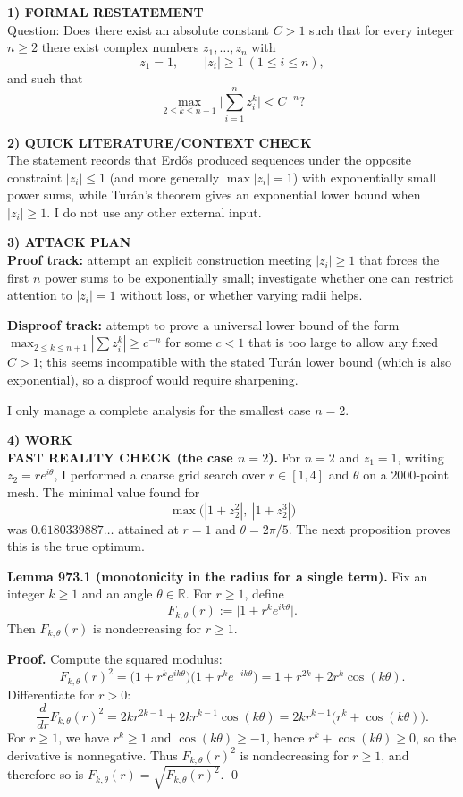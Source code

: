 \medskip
\noindent\textbf{1) FORMAL RESTATEMENT}\\
Question: Does there exist an absolute constant $C>1$ such that for every integer $n\ge 2$ there exist complex numbers $z_1,\dots,z_n$ with
\[
 z_1=1,\qquad |z_i|\ge 1\ (1\le i\le n),
\]
and such that
\[
 \max_{2\le k\le n+1}\Big|\sum_{i=1}^n z_i^k\Big| < C^{-n}?
\]

\medskip
\noindent\textbf{2) QUICK LITERATURE/CONTEXT CHECK}\\
The statement records that Erd\H{o}s produced sequences under the opposite constraint $|z_i|\le 1$ (and more generally $\max|z_i|=1$) with exponentially small power sums, while Tur\'an's theorem gives an exponential lower bound when $|z_i|\ge 1$.  I do not use any other external input.

\medskip
\noindent\textbf{3) ATTACK PLAN}\\
\textbf{Proof track:} attempt an explicit construction meeting $|z_i|\ge 1$ that forces the first $n$ power sums to be exponentially small; investigate whether one can restrict attention to $|z_i|=1$ without loss, or whether varying radii helps.

\textbf{Disproof track:} attempt to prove a universal lower bound of the form $\max_{2\le k\le n+1}|\sum z_i^k|\ge c^{-n}$ for some $c<1$ that is too large to allow any fixed $C>1$; this seems incompatible with the stated Tur\'an lower bound (which is also exponential), so a disproof would require sharpening.

I only manage a complete analysis for the smallest case $n=2$.

\medskip
\noindent\textbf{4) WORK}\\
\textbf{FAST REALITY CHECK (the case $n=2$).}  For $n=2$ and $z_1=1$, writing $z_2=re^{i\theta}$, I performed a coarse grid search over $r\in[1,4]$ and $\theta$ on a $2000$-point mesh.  The minimal value found for
\[
\max\big(|1+z_2^2|,\ |1+z_2^3|\big)
\]
was $0.6180339887\dots$ attained at $r=1$ and $\theta=2\pi/5$.
The next proposition proves this is the true optimum.

\medskip
\noindent\textbf{Lemma 973.1 (monotonicity in the radius for a single term).}\label{lem:973-radius}
Fix an integer $k\ge 1$ and an angle $\theta\in\mathbb{R}$.  For $r\ge 1$, define
\[
F_{k,\theta}(r):=\big|1+r^k e^{ik\theta}\big|.
\]
Then $F_{k,\theta}(r)$ is nondecreasing for $r\ge 1$.

\noindent\textbf{Proof.}
Compute the squared modulus:
\[
F_{k,\theta}(r)^2 = \big(1+r^k e^{ik\theta}\big)\big(1+r^k e^{-ik\theta}\big)=1+r^{2k}+2r^k\cos(k\theta).
\]
Differentiate for $r>0$:
\[
\frac{d}{dr}F_{k,\theta}(r)^2 = 2k r^{2k-1} + 2k r^{k-1}\cos(k\theta)
=2k r^{k-1}\big(r^k+\cos(k\theta)\big).
\]
For $r\ge 1$, we have $r^k\ge 1$ and $\cos(k\theta)\ge -1$, hence $r^k+\cos(k\theta)\ge 0$, so the derivative is nonnegative.
Thus $F_{k,\theta}(r)^2$ is nondecreasing for $r\ge 1$, and therefore so is $F_{k,\theta}(r)=\sqrt{F_{k,\theta}(r)^2}$. \qed

